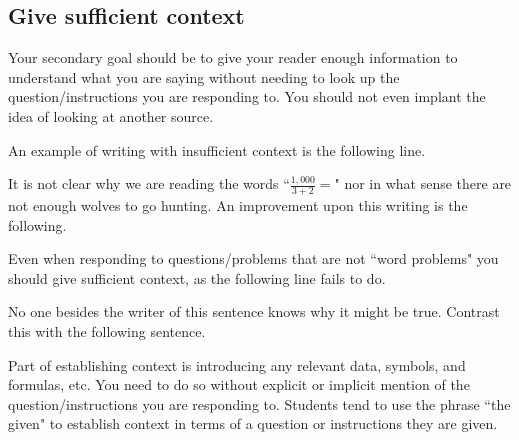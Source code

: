 \documentclass[12pt]{article}
\def\thup{\rightthumbsup}
\def\thdn{\rightthumbsdown}
\begin{document}

\subsection {\bfseries Give sufficient context} 
Your secondary goal should be to give your reader enough information to understand what you are saying without needing to look up the question/instructions you are responding to. You should not even implant the idea of looking at another source.


An example of writing with insufficient context is the following line.
\begin{quote}
\thdn
\end{quote}
It is not clear why we are reading the words ``$\frac{1,000}{3+2}=$" nor in what sense there are not enough wolves to go hunting. An improvement upon this writing is the following. 
\begin{quote}
\thup
\end{quote}
Even when responding to questions/problems that are not ``word problems" you should give sufficient context, as the following line fails to do.
\begin{quote}
 \thdn
\end{quote}
No one besides the writer of this sentence knows why it might be true. Contrast this with the following sentence.
\begin{quote}
\thup 
\end{quote}


Part of establishing context is introducing any relevant data, symbols, and formulas, etc. You need to do so without explicit or implicit mention of the question/instructions you are responding to.
Students tend to use the phrase ``the given" to establish context in terms of a question or instructions they are given. 
\end{document}
